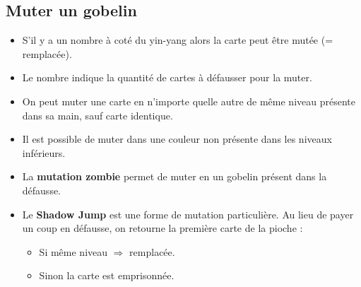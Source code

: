 \documentclass[10pt, a4paper]{article}	%
\begin{document}
\begin{multicols}{3}
\subsection{Muter un gobelin}
\begin{itemize}
	\item S'il y a un nombre à coté du yin-yang alors la carte peut être mutée (= remplacée).
	\item Le nombre indique la quantité de cartes à défausser pour la muter.
	\item On peut muter une carte en n'importe quelle autre de même niveau présente dans sa main, sauf carte identique.
	\item Il est possible de muter dans une couleur non présente dans les niveaux inférieurs.
	\item La \textbf{mutation zombie} permet de muter en un gobelin présent dans la défausse.
	\item \color{Plum} Le \textbf{Shadow Jump} est une forme de mutation particulière. Au lieu de payer un coup en défausse, on retourne la première carte de la pioche : 
	\begin{itemize}
		\item Si même niveau $\Rightarrow$ remplacée.
		\item Sinon la carte est emprisonnée.
	\end{itemize}
\end{itemize}



\end{multicols}
\end{document}
